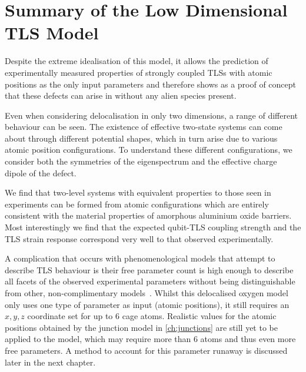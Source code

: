 \section{Summary of the Low Dimensional TLS Model}\label{sec:lowsummary}

Despite the extreme idealisation of this model, it allows the prediction of experimentally measured properties of strongly coupled TLSs with atomic positions as the only input parameters and therefore shows as a proof of concept that these defects can arise in  without any alien species present.

Even when considering delocalisation in only two dimensions, a range of different behaviour can be seen.
The existence of effective two-state systems can come about through different potential shapes, which in turn arise due to various atomic position configurations.
To understand these different configurations, we consider both the symmetries of the eigenspectrum and the effective charge dipole of the defect.

We find that two-level systems with equivalent properties to those seen in experiments can be formed from atomic configurations which are entirely consistent with the material properties of amorphous aluminium oxide barriers.
Most interestingly we find that the expected qubit-TLS coupling strength and the TLS strain response correspond very well to that observed experimentally.

A complication that occurs with phenomenological models that attempt to describe TLS behaviour is their free parameter count is high enough to describe all facets of the observed experimental parameters without being distinguishable from other, non-complimentary models~\cite{Cole2010}.
Whilst this delocalised oxygen model only uses one type of parameter as input (atomic positions), it still requires an $x, y, z$  coordinate set for up to $6$ cage atoms.
Realistic values for the atomic positions obtained by the junction model in \cref{ch:junctions} are still yet to be applied to the model, which may require more than $6$ atoms and thus even more free parameters.
A method to account for this parameter runaway is discussed later in the next chapter. 
